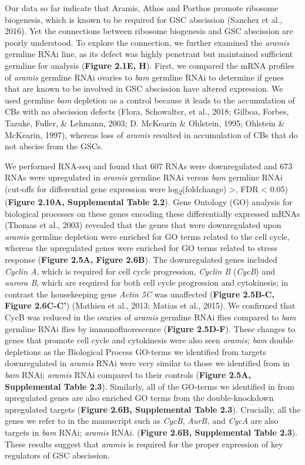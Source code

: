 \documentclass[12pt,oneside]{reedthesis}
\begin{document}
Our data so far indicate that Aramis, Athos and Porthos promote ribosome
biogenesis, which is known to be required for GSC abscission
(Sanchez et al., 2016). Yet the connections between ribosome biogenesis and
GSC abscission are poorly understood. To explore the connection, we
further examined the \emph{aramis} germline RNAi line, as its defect was
highly penetrant but maintained sufficient germline for analysis
(\textbf{Figure 2.1E, H}). First, we compared the mRNA profiles of \emph{aramis}
germline RNAi ovaries to \emph{bam} germline RNAi to determine if genes that
are known to be involved in GSC abscission have altered expression. We
used germline \emph{bam} depletion as a control because it leads to the
accumulation of CBs with no abscission defects (Flora, Schowalter, et al., 2018; Gilboa, Forbes, Tazuke, Fuller, \& Lehmann, 2003; D. McKearin \& Ohlstein, 1995; Ohlstein \& McKearin, 1997), whereas loss of \emph{aramis}
resulted in accumulation of CBs that do not abscise from the GSCs.

We performed RNA-seq and found that 607 RNAs were downregulated and 673
RNAs were upregulated in \emph{aramis} germline RNAi versus \emph{bam} germline
RNAi (cut-offs for differential gene expression were log\textsubscript{2}(foldchange)
\textgreater{}\textbar, FDR \textless{} 0.05) (\textbf{Figure 2.10A, Supplemental Table 2.2}). Gene
Ontology (GO) analysis for biological processes on these genes encoding
these differentially expressed mRNAs
(Thomas et al., 2003) revealed that the genes that were
downregulated upon \emph{aramis} germline depletion were enriched for GO
terms related to the cell cycle, whereas the upregulated genes were
enriched for GO terms related to stress response (\textbf{Figure 2.5A, Figure 2.6B}). The downregulated genes included \emph{Cyclin A}, which is required
for cell cycle progression, \emph{Cyclin B} (\emph{CycB}) and \emph{aurora B}, which
are required for both cell cycle progression and cytokinesis; in
contrast the housekeeping gene \emph{Actin 5C} was unaffected (\textbf{Figure 2.5B-C, Figure 2.6C-C'}) (Mathieu et al., 2013; Matias et al., 2015). We confirmed that
CycB was reduced in the ovaries of \emph{aramis} germline RNAi flies compared
to \emph{bam} germline RNAi flies by immunofluorescence (\textbf{Figure 2.5D-F}).
These changes to genes that promote cell cycle and cytokinesis were also
seen \emph{aramis; bam} double depletions as the Biological Process GO-terms
we identified from targets downregulated in \emph{aramis} RNAi were very
similar to those we identified from in \emph{bam} RNAi; \emph{aramis} RNAi
compared to their controls (\textbf{Figure 2.5A, Supplemental Table 2.3}). Similarly,
all of the GO-terms we identified in from upregulated genes are also
enriched GO terms from the double-knockdown upregulated targets (\textbf{Figure 2.6B, Supplemental Table 2.3}).
Crucially, all the genes we refer to in the
manuscript such as \emph{CycB}, \emph{AurB,} and \emph{CycA} are also targets in \emph{bam}
RNAi; \emph{aramis} RNAi. (\textbf{Figure 2.6B, Supplemental Table 2.3}). These
results suggest that \emph{aramis} is required for the proper expression of
key regulators of GSC abscission.
\end{document}
